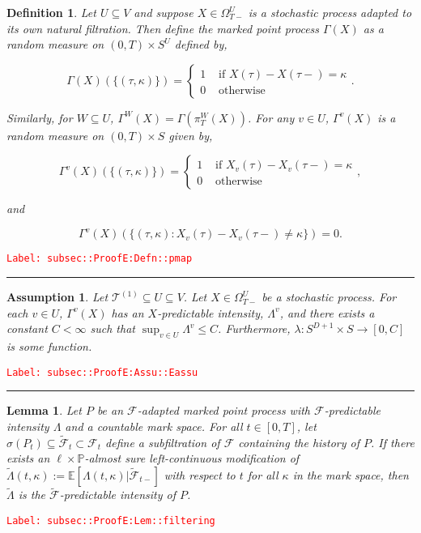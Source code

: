 \documentclass[12pt]{article}
\newcommand{\mb}{\mathbb}
\newcommand{\mc}{\mathcal}
\newcommand{\ra}{\rightarrow}
\newcommand{\te}{\text}
\newcommand{\tr}{\textcolor{red}}
\newcommand{\labe}[1]{\tr{\texttt{Label: #1}}}
\newcommand{\lin}{\rule{\linewidth}{0.4 pt}}
\newcommand{\pr}{\mb{P}}							%
\newcommand{\ex}[1]{\mb{E}\left[#1\right]}			%
\renewcommand{\v}{v}							%
\renewcommand{\U}{U}							%
\newcommand{\UU}{W}								%
\renewcommand{\S}{S}							%
\newcommand{\T}{T}								%
\renewcommand{\t}{t}							%
\newcommand{\sset}{\Omega}						%
\newcommand{\proj}{\pi}							%
\newcommand{\F}{\mc{F}}							%
\newcommand{\X}{X}								%
\newcommand{\vind}[1]{^{#1}}					%
\newcommand{\carp}[1]{^{#1}}					%
\newcommand{\vsi}[1]{^{#1}}						%
\newcommand{\cind}[1]{_{#1}}					%
\newcommand{\tp}[1]{(#1)}						%
\newcommand{\ts}[1]{_{#1}}						%
\newcommand{\const}{C}							%
\newcommand{\degr}{D}							%
\newcommand{\tree}{\mc{T}}						%
\newcommand{\sln}[1]{^{(#1)}}					%
\newcommand{\Sm}{\ell}							%
\newcommand{\alt}[1]{\widetilde{#1}}			%
\newcommand{\rt}{\tau}							%
\newcommand{\pmap}{\Gamma}						%
\renewcommand{\mark}{\kappa}					%
\newcommand{\rp}{P}								%
\newcommand{\ratee}{\Lambda}					%
\newcommand{\cratee}{\alt{\Lambda}} 			%
\newtheorem{lem}[thms]{Lemma}
\newtheorem{defn}[thms]{Definition}
\newtheorem{assu}[thms]{Assumption}
\begin{document}
\begin{defn}
Let \(\U\subseteq V\) and suppose \(\X \in \sset\vsi{\U}\ts{\T-}\) is a stochastic process adapted to its own natural filtration. Then define the marked point process \(\pmap(\X)\) as a random measure on \((0,\T) \times \S\carp{\U}\) defined by,

\[\pmap(\X)(\{(\rt,\mark)\}) = \begin{cases}
1 &\te{ if } \X\tp{\rt} - \X\tp{\rt-} = \mark\\
0 &\te{ otherwise}
\end{cases}.\]

Similarly, for \(\UU \subseteq \U\), \(\pmap\vind{\UU}(\X) = \pmap\left(\proj\vsi{\UU}\ts{\T}(\X)\right)\). For any \(\v\in \U\), \(\pmap\vind{\v}(\X)\) is a random measure on \((0,\T) \times \S\) given by,

\[\pmap\vind{\v}(\X)(\{(\rt,\mark)\}) = \begin{cases}
1 &\te{ if } \X\cind{\v}\tp{\rt} - \X\cind{\v}\tp{\rt-} = \mark\\
0 &\te{ otherwise}
\end{cases},\]

and

\[\pmap\vind{\v}(\X)(\{(\rt,\mark): \X\cind{\v}\tp{\rt} - \X\cind{\v}\tp{\rt-} \neq \mark\}) = 0.\]
\label{subsec::ProofE:Defn::pmap}
\end{defn}
\labe{subsec::ProofE:Defn::pmap}

\lin

\begin{assu}
Let \(\tree\sln{1}\subseteq\U \subseteq V\). Let \(\X\in \sset\vsi{\U}\ts{\T-}\) be a stochastic process. For each \(\v\in \U\), \(\pmap\vind{\v}(\X)\) has an \(\X\)-predictable intensity, \(\ratee\vind{\v}\), and there exists a constant \(\const < \infty\) such that \(\sup_{\v\in\U} \ratee\vind{\v} \leq \const\). Furthermore, \(\lambda: \S\carp{\degr+1}\times \S\ra[0,\const]\) is some function.
\label{subsec::ProofE:Assu::Eassu}
\end{assu}
\labe{subsec::ProofE:Assu::Eassu}

\lin

\begin{lem}
Let \(\rp\) be an \(\F\)-adapted marked point process with \(\F\)-predictable intensity \(\ratee\) and a countable mark space. For all \(\t \in [0,\T]\), let \(\sigma(\rp\ts{\t}) \subseteq \alt{\F}\ts{\t}\subset \F\ts{\t}\) define a subfiltration of \(\F\) containing the history of \(\rp\). If there exists an \(\Sm\times \pr\)-almost sure left-continuous modification of \(\cratee{}{}(\t,\mark) := \ex{\ratee(\t,\mark)|\alt{\F}\ts{\t-}}\) with respect to \(\t\) for all \(\mark\) in the mark space, then \(\cratee{}{}\) is the \(\alt{\F}\)-predictable intensity of \(\rp\).
\label{subsec::ProofE:Lem::filtering}
\end{lem}
\labe{subsec::ProofE:Lem::filtering}
\end{document}
